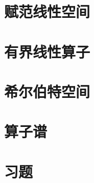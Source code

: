 \documentclass[lang=cn,10pt]{elegantbook}
\begin{document}
\chapter{赋范线性空间}

\chapter{有界线性算子}

\chapter{希尔伯特空间}

\chapter{算子谱}

\chapter{习题}

\end{document}
